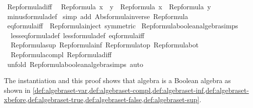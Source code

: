\begin{isabellebody}
%
\endisadelimproof
\isanewline
{}\isamarkupfalse%
\ Rep{\isacharunderscore}formula{\isacharunderscore}diff{\isacharcolon}\isanewline
\ \ {\isachardoublequoteopen}Rep{\isacharunderscore}formula\ {\isacharparenleft}x\ {\isacharminus}\ y{\isacharparenright}\ {\isacharequal}\ Rep{\isacharunderscore}formula\ x\ {\isacharminus}\ Rep{\isacharunderscore}formula\ y{\isachardoublequoteclose}\isanewline
%
\isadelimproof
%
\endisadelimproof
%
\isatagproof
{}\isamarkupfalse%
\ minus{\isacharunderscore}formula{\isacharunderscore}def\isanewline
{}\isamarkupfalse%
\ {\isacharparenleft}simp\ add{\isacharcolon}\ Abs{\isacharunderscore}formula{\isacharunderscore}inverse\ Rep{\isacharunderscore}formula{\isacharparenright}%
\endisatagproof
{\isafoldproof}%
%
\isadelimproof
\isanewline
%
\endisadelimproof
\isanewline
{}\isamarkupfalse%
\ eq{\isacharunderscore}formula{\isacharunderscore}iff\ {\isacharequal}\ Rep{\isacharunderscore}formula{\isacharunderscore}inject\ {\isacharbrackleft}symmetric{\isacharbrackright}\isanewline
\isanewline
{}\isamarkupfalse%
\ Rep{\isacharunderscore}formula{\isacharunderscore}boolean{\isacharunderscore}algebra{\isacharunderscore}simps\ {\isacharequal}\isanewline
\ \ less{\isacharunderscore}eq{\isacharunderscore}formula{\isacharunderscore}def\ less{\isacharunderscore}formula{\isacharunderscore}def\ eq{\isacharunderscore}formula{\isacharunderscore}iff\isanewline
\ \ Rep{\isacharunderscore}formula{\isacharunderscore}sup\ Rep{\isacharunderscore}formula{\isacharunderscore}inf\ Rep{\isacharunderscore}formula{\isacharunderscore}top\ Rep{\isacharunderscore}formula{\isacharunderscore}bot\isanewline
\ \ Rep{\isacharunderscore}formula{\isacharunderscore}compl\ Rep{\isacharunderscore}formula{\isacharunderscore}diff\ \isanewline
\ \ \isanewline
{}\isamarkupfalse%
%
\isadelimproof
\ %
\endisadelimproof
%
\isatagproof
{}\isamarkupfalse%
\isanewline
{}\isamarkupfalse%
\ {\isacharparenleft}unfold\ Rep{\isacharunderscore}formula{\isacharunderscore}boolean{\isacharunderscore}algebra{\isacharunderscore}simps{\isacharcomma}\ auto{\isacharparenright}%
\endisatagproof
{\isafoldproof}%
%
\isadelimproof
%
\endisadelimproof
%
\begin{isamarkuptext}%
The instantiation and this proof shows that \ac{algebra} is a Boolean algebra as shown in \cref{def:algebraset-var,def:algebraset-compl,def:algebraset-inf,def:algebraset-xbefore,def:algebraset-true,def:algebraset-false,def:algebraset-sup}.%
\end{isamarkuptext}\isamarkuptrue%

\end{isabellebody}
